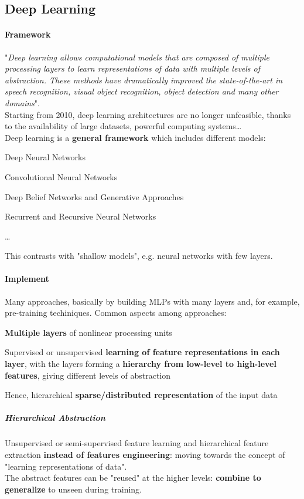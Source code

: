 \documentclass[10pt]{report}
\begin{document}
\subsection{Deep Learning}
\paragraph{Framework} "\textit{Deep learning  allows computational models that are composed of
multiple processing layers to learn representations of data with multiple levels of abstraction. These methods have dramatically improved the state-of-the-art in speech recognition, visual object recognition, object detection and many other domains}".\\
Starting from 2010, deep learning architectures are no longer unfeasible, thanks to the availability of large datasets, powerful computing systems\ldots\\
Deep learning is a \textbf{general framework} which includes different models:
\begin{list}{}{}
	\item Deep Neural Networks
	\item Convolutional Neural Networks
	\item Deep Belief Networks and Generative Approaches
	\item Recurrent and Recursive Neural Networks
	\item \ldots
\end{list}
This contrasts with "shallow models", e.g. neural networks with few layers.
\paragraph{Implement} Many approaches, basically by building MLPs with many layers and, for example, pre-training techiniques. Common aspects among approaches:
\begin{list}{}{}
	\item \textbf{Multiple layers} of nonlinear processing units
	\item Supervised or unsupervised \textbf{learning of feature representations in each layer}, with the layers forming a \textbf{hierarchy from low-level to high-level features}, giving different levels of abstraction
	\item Hence, hierarchical \textbf{sparse/distributed representation} of the input data
\end{list}
\subparagraph{Hierarchical Abstraction} Unsupervised or semi-supervised feature learning and hierarchical feature extraction \textbf{instead of features engineering}: moving towards the concept of "learning representations of data".\\
The abstract features can be "reused" at the higher levels: \textbf{combine to generalize} to unseen during training.
\end{document}
